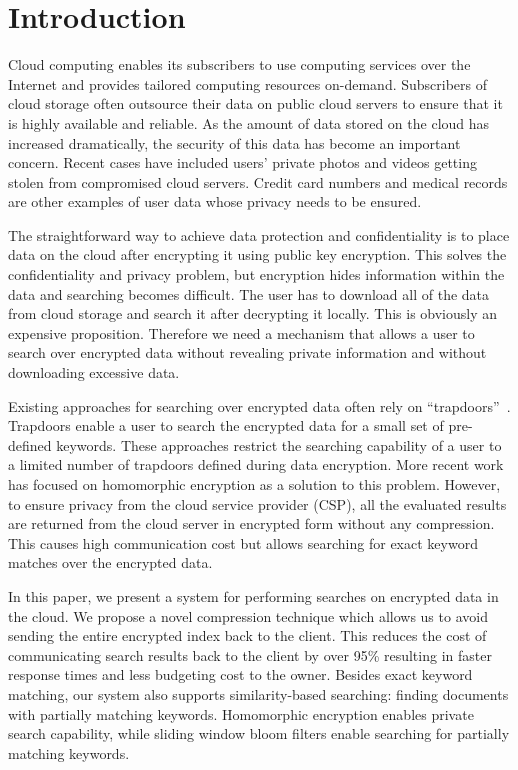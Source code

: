 \section{Introduction}

Cloud computing enables its subscribers to use computing services over the 
Internet and provides tailored computing resources on-demand. 
Subscribers of cloud storage often outsource their data on public cloud servers
to ensure that it is highly available and reliable. 
As the amount of data stored on the cloud has increased dramatically, the security 
of this data has become an important concern. Recent cases
have included users' private photos and videos getting stolen from compromised cloud servers. Credit card numbers and medical
records are other examples of user data whose privacy needs to be ensured.

The straightforward way to achieve data protection and confidentiality is to
place data on the cloud after encrypting it using public key encryption.
This solves the confidentiality and privacy problem,
but encryption hides information within the data and searching becomes 
difficult. The user
has to download all of the data from cloud storage and search it after 
decrypting it locally. 
This is
obviously an expensive proposition. Therefore we need a mechanism 
that allows a user to search over encrypted data without revealing 
private information and without downloading excessive data.

Existing approaches for searching over encrypted data often rely on
``trapdoors''~\cite{song,goh2003secure,boneh}. 
Trapdoors enable a user to search the encrypted data for a small 
set of pre-defined keywords. These approaches restrict the searching
capability of a user to a limited number of trapdoors defined during data 
encryption. More recent work has focused on homomorphic encryption \cite{craig} as a solution
to this problem. However, to ensure privacy from the cloud service provider (CSP), 
all the evaluated results
are returned from the cloud server in encrypted form without any compression. This causes high
communication cost but allows searching for exact keyword matches over the encrypted data.

In this paper, we present a system for performing searches on encrypted 
data in the cloud. We propose a novel compression technique which allows us to
avoid sending the entire encrypted index back to the client. This reduces
the cost of communicating search results back to the client by over 95\% resulting in 
faster response times and less budgeting cost to the owner. 
Besides exact keyword matching, our system also
supports similarity-based searching: finding documents with partially matching 
keywords. Homomorphic encryption enables private search capability, 
while sliding window 
bloom filters enable searching for partially matching keywords. 

